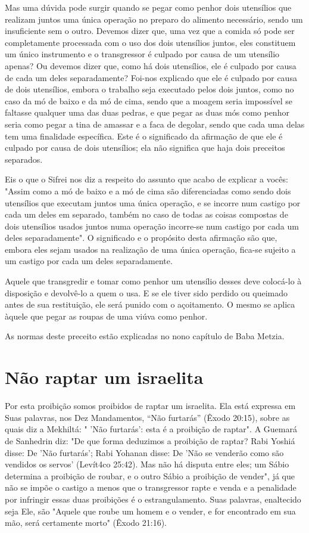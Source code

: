 Mas uma dúvida pode surgir quando se pegar como penhor dois uten­sílios
que realizam juntos uma única operação no preparo do alimento
necessá­rio, sendo um insuficiente sem o outro. Devemos dizer que, uma
vez que a co­mida só pode ser completamente processada com o uso dos
dois utensílios jun­tos, eles constituem um único instrumento e o
transgressor é culpado por cau­sa de um utensílio apenas? Ou devemos
dizer que, como há dois utensílios, ele é culpado por causa de cada um
deles separadamente? Foi-nos explicado que ele é culpado por causa de
dois utensílios, embora o trabalho seja executado pelos dois juntos,
como no caso da mó de baixo e da mó de cima, sendo que a moagem seria
impossível se faltasse qualquer uma das duas pedras, e que pe­gar as
duas mós como penhor seria como pegar a tina de amassar e a faca de
degolar, sendo que cada uma delas tem uma finalidade específica. Este é
o sig­nificado da afirmação de que ele é culpado por causa de dois
utensílios; ela não significa que haja dois preceitos separados.

Eis o que o Sifrei nos diz a respeito do assunto que acabo de expli­car
a vocês: "Assim como a mó de baixo e a mó de cima são diferenciadas como
sendo dois utensílios que executam juntos uma única operação, e se
incorre num castigo por cada um deles em separado, também no caso de
to­das as coisas compostas de dois utensílios usados juntos numa
operação incorre-se num castigo por cada um deles separadamente". O
significado e o pro­pósito desta afirmação são que, embora eles sejam
usados na realização de uma única operação, fica-se sujeito a um castigo
por cada um deles sepa­radamente.

Aquele que transgredir e tomar como penhor um utensílio desses deve
colocá-lo à disposição e devolvê-lo a quem o usa. E se ele tiver sido
per­dido ou queimado antes de sua restituição, ele será punido com o
açoita­mento. O mesmo se aplica àquele que pegar as roupas de uma viúva
como penhor.

As normas deste preceito estão explicadas no nono capítulo de Baba
Metzia.

\section{Não raptar um israelita}

Por esta proibição somos proibidos de raptar um israelita. Ela está
expressa em Suas palavras, nos Dez Mandamentos, ``Não furtarás'' (Êxodo
20:15), sobre as quais diz a Mekhiltá: " 'Não furtarás': esta é a
proibição de raptar". A Guemará de Sanhedrin diz: "De que forma
deduzimos a proibição de raptar? Rabi Yoshiá disse: De 'Não furtarás';
Rabi Yohanan disse: De 'Não se venderão como são vendidos os servos'
(Levít4co 25:42). Mas não há disputa entre eles; um Sábio determina a
proibição de roubar, e o outro Sábio a proibição de ven­der", já que não
se impõe o castigo a menos que o transgressor rapte e venda
e a penalidade por infringir essas duas proibições é o estrangulamento.
Suas palavras, enaltecido seja Ele, são "Aquele que roube um homem e o
vender, e for encontrado em sua mão, será certamente morto" (Êxodo 21:16).

